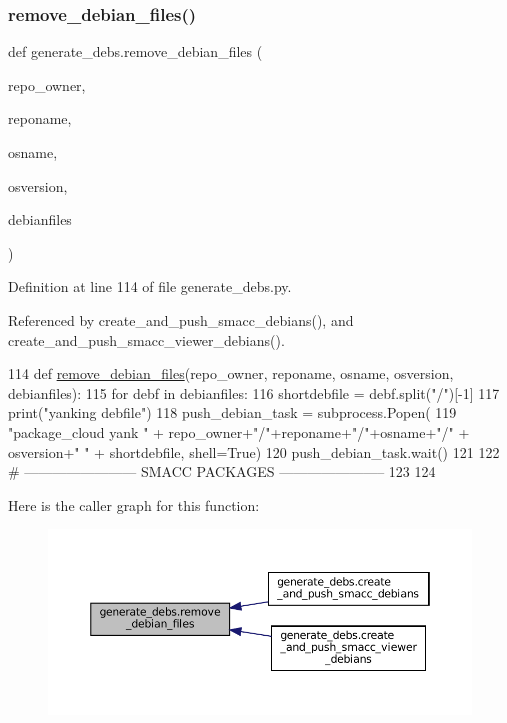 \subsubsection{\texorpdfstring{remove\+\_\+debian\+\_\+files()}{remove\_debian\_files()}}
{\footnotesize\ttfamily def generate\+\_\+debs.\+remove\+\_\+debian\+\_\+files (\begin{DoxyParamCaption}\item[{}]{repo\+\_\+owner,  }\item[{}]{reponame,  }\item[{}]{osname,  }\item[{}]{osversion,  }\item[{}]{debianfiles }\end{DoxyParamCaption})}



Definition at line 114 of file generate\+\_\+debs.\+py.



Referenced by create\+\_\+and\+\_\+push\+\_\+smacc\+\_\+debians(), and create\+\_\+and\+\_\+push\+\_\+smacc\+\_\+viewer\+\_\+debians().


\begin{DoxyCode}
114 \textcolor{keyword}{def }\hyperlink{namespacegenerate__debs_a08095040d038b3613ad0e77fd4e7f60e}{remove\_debian\_files}(repo\_owner, reponame,  osname, osversion, debianfiles):
115     \textcolor{keywordflow}{for} debf \textcolor{keywordflow}{in} debianfiles:
116         shortdebfile = debf.split(\textcolor{stringliteral}{"/"})[-1]
117         print(\textcolor{stringliteral}{"yanking debfile"})
118         push\_debian\_task = subprocess.Popen(
119             \textcolor{stringliteral}{"package\_cloud yank "} + repo\_owner+\textcolor{stringliteral}{"/"}+reponame+\textcolor{stringliteral}{"/"}+osname+\textcolor{stringliteral}{"/"} + osversion+\textcolor{stringliteral}{" "} + shortdebfile, 
      shell=\textcolor{keyword}{True})
120         push\_debian\_task.wait()
121 
122 \textcolor{comment}{# ------------------------ SMACC PACKAGES -----------------------}
123 
124 
\end{DoxyCode}
Here is the caller graph for this function\+:
\nopagebreak
\begin{figure}[H]
\begin{center}
\leavevmode
\includegraphics[width=350pt]{namespacegenerate__debs_a08095040d038b3613ad0e77fd4e7f60e_icgraph}
\end{center}
\end{figure}



